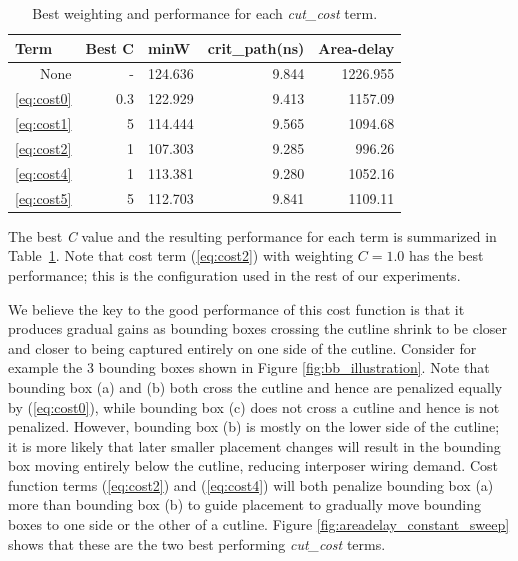 \documentclass{sig-alternate-2013}
\begin{document}
\begin{table}[htbp]
\begin{tabular}{|r|r|r|r|r|}
\hline
\multicolumn{1}{|l|}{Term} & \multicolumn{1}{l|}{Best C} & \multicolumn{1}{l|}{minW} & \multicolumn{1}{l|}{crit\_path(ns)} & \multicolumn{1}{l|}{Area-delay} \\ \hline \hline
None & - & 124.636 & 9.844 & 1226.955 \\ \hline
\ref{eq:cost0} & 0.3 & 122.929 & 9.413 & 1157.09 \\ \hline
\ref{eq:cost1} & 5 & 114.444 & 9.565 & 1094.68 \\ \hline
\ref{eq:cost2} & 1 & 107.303 & 9.285 & 996.26 \\ \hline
\ref{eq:cost4} & 1 & 113.381 & 9.280 & 1052.16 \\ \hline
\ref{eq:cost5} & 5 & 112.703 & 9.841 & 1109.11 \\ \hline
\end{tabular}
\caption{Best weighting and performance for each \textit{cut\_cost} term.}
\label{table:constant_sweep}
\end{table}

The best \textit{C} value and the resulting performance for each term is summarized in Table~\ref{table:constant_sweep}. Note that cost term (\ref{eq:cost2}) with weighting $C = 1.0$ has the best performance; this is the configuration used in the rest of our experiments.

We believe the key to the good performance of this cost function is that it produces gradual gains as bounding boxes crossing the cutline shrink to be closer and closer to being captured entirely on one side of the cutline. Consider for example the 3 bounding boxes shown in Figure \ref{fig:bb_illustration}. Note that bounding box (a) and (b) both cross the cutline and hence are penalized equally by (\ref{eq:cost0}), while bounding box (c) does not cross a cutline and hence is not penalized. However, bounding box (b) is mostly on the lower side of the cutline; it is more likely that later smaller placement changes will result in the bounding box moving entirely below the cutline, reducing interposer wiring demand. Cost function terms (\ref{eq:cost2}) and (\ref{eq:cost4}) will both penalize bounding box (a) more than bounding box (b) to guide placement to gradually move bounding boxes to one side or the other of a cutline. Figure \ref{fig:areadelay_constant_sweep} shows that these are the two best performing \textit{cut\_cost} terms.
\end{document}

